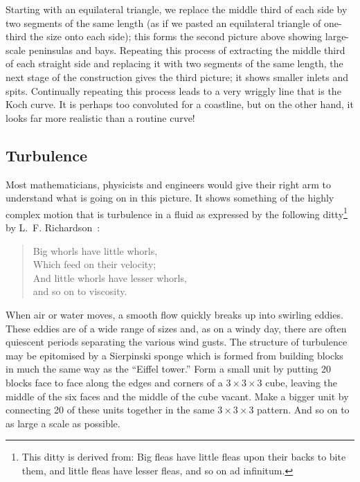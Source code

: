 \documentclass[12pt,a5paper]{article}
\begin{document}
Starting with an equilateral triangle, we replace the middle third of 
each side by two segments of the same length (as if we pasted an 
equilateral triangle of one-third the size onto each side); this 
forms the second picture above showing large-scale peninsulas and 
bays.  Repeating this process of extracting the middle third of each 
straight side and replacing it with two segments of the same length, 
the next stage of the construction gives the third picture; it shows 
smaller inlets and spits.  Continually repeating this process leads 
to a very wriggly line that is the Koch curve.  It is perhaps too 
convoluted for a coastline, but on the other hand, it looks far more 
realistic than a routine curve!

\subsection{Turbulence}
\label{ssturb}

Most mathematicians, physicists and engineers would give their right 
arm to understand what is going on in this picture.  It shows 
something of the highly complex motion that is turbulence in a fluid 
as expressed by the following ditty\footnote{This ditty is derived 
from: Big fleas have little fleas upon their backs to bite them, and 
little fleas have lesser fleas, and so on ad infinitum.} by 
L.~F. Richardson~\cite{Rich}:
\begin{verse}
	Big whorls have little whorls,\\
	Which feed on their velocity;\\
	And little whorls have lesser whorls,\\
	and so on to viscosity.
\end{verse}

When air or water moves, a smooth flow quickly breaks up into 
swirling eddies.  These eddies are of a wide range of sizes and, as 
on a windy day, there are often quiescent periods separating the 
various wind gusts.  The structure of turbulence may be epitomised by 
a Sierpinski sponge which is formed from building blocks in much the 
same way as the ``Eiffel tower.''  Form a small unit by putting 20 
blocks face to face along the edges and corners of a $3\times 
3\times 3$ cube, 
leaving the middle of the six faces and the middle of the cube 
vacant.  Make a bigger unit by connecting 20 of these units together 
in the same 
\(
	3\times 3\times 3
\)
 pattern.  And so on to as large a scale as possible.
 
 
\end{document}
